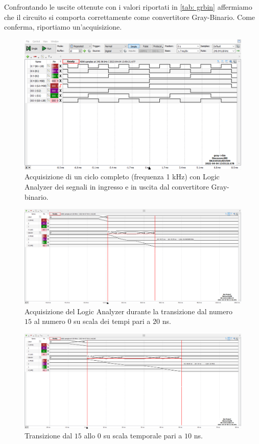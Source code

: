 \documentclass[10pt, a4paper, italian]{article}
\begin{document}
Confrontando le uscite ottenute con i valori riportati in \cref{tab: grbin} affermiamo che il circuito si comporta correttamente come convertitore Gray-Binario. Come conferma, riportiamo un'acquisizione.\\
\begin{figure}[htbp]
    \centering
    \includegraphics[width=\textwidth]{graybin}
    \caption{Acquisizione di un ciclo completo (frequenza 1 kHz) con Logic
    Analyzer dei segnali in ingresso e in uscita dal convertitore Gray-binario.}
\end{figure}
\begin{figure}[htbp]
    \centering
    \includegraphics[width=\textwidth]{gray20ns}
    \caption{Acquisizione del Logic Analyzer durante la transizione dal numero $15$ al numero $0$ su scala dei tempi pari a $20$ ns.}
\end{figure}
\begin{figure}[htbp]
    \centering
    \includegraphics[width=\textwidth]{gray10ns}
    \caption{\label{fig: prop}Transizione dal $15$ allo $0$ su scala temporale pari a $10$ ns.}
\end{figure}
\end{document}
